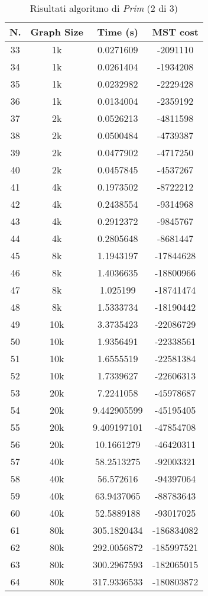 \begin{table}[H]
	\centering
	\begin{tabular}{|c|c|c|c|}
		\hline
		\textbf{N.} & \textbf{Graph Size} & \textbf{Time (s)} & \textbf{MST cost}\\
		\hline
		33 & 1k & 0.0271609 & -2091110\\
		\hline
		34 & 1k & 0.0261404 & -1934208\\
		\hline
		35 & 1k & 0.0232982 & -2229428\\
		\hline
		36 & 1k & 0.0134004 & -2359192\\
		\hline\hline
		37 & 2k & 0.0526213 & -4811598\\
		\hline
		38 & 2k & 0.0500484 & -4739387\\
		\hline
		39 & 2k & 0.0477902 & -4717250\\
		\hline
		40 & 2k & 0.0457845 & -4537267\\
		\hline\hline
		41 & 4k & 0.1973502 & -8722212\\
		\hline
		42 & 4k & 0.2438554 & -9314968\\
		\hline
		43 & 4k & 0.2912372 & -9845767\\
		\hline
		44 & 4k & 0.2805648 & -8681447\\
		\hline\hline
		45 & 8k & 1.1943197 & -17844628\\
		\hline
		46 & 8k & 1.4036635 & -18800966\\
		\hline
		47 & 8k & 1.025199 & -18741474\\
		\hline
		48 & 8k & 1.5333734 & -18190442\\
		\hline\hline
		49 & 10k & 3.3735423 & -22086729\\
		\hline
		50 & 10k & 1.9356491 & -22338561\\
		\hline
		51 & 10k & 1.6555519 & -22581384\\
		\hline
		52 & 10k & 1.7339627 & -22606313\\
		\hline\hline
		53 & 20k & 7.2241058 & -45978687\\
		\hline
		54 & 20k & 9.442905599 & -45195405\\
		\hline
		55 & 20k & 9.409197101 & -47854708\\
		\hline
		56 & 20k & 10.1661279 & -46420311\\
		\hline\hline
		57 & 40k & 58.2513275 & -92003321\\
		\hline
		58 & 40k & 56.572616 & -94397064\\
		\hline
		59 & 40k & 63.9437065 & -88783643\\
		\hline
		60 & 40k & 52.5889188 & -93017025\\
		\hline\hline
		61 & 80k & 305.1820434 & -186834082\\
		\hline
		62 & 80k & 292.0056872 & -185997521\\
		\hline
		63 & 80k & 300.2967593 & -182065015\\
		\hline
		64 & 80k & 317.9336533 & -180803872\\
		\hline
	\end{tabular}
\caption{Risultati algoritmo di \textit{Prim} (2 di 3)}
\end{table}

